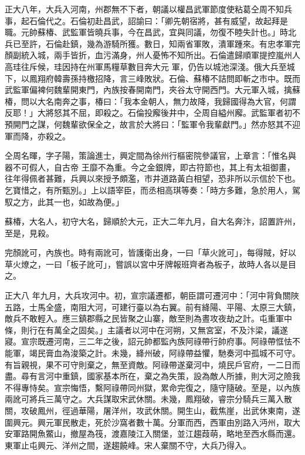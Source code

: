 \begin{pinyinscope}
 正大八年，大兵入河南，州郡無不下者，朝議以權昌武軍節度使粘葛仝周不知兵事，起石倫代之。石倫初赴昌武，詔諭曰：「卿先朝宿將，甚有威望，故起拜是職。元帥蘇椿、武監軍皆曉兵事，今在昌武，宜與同議，勿復不睦失計也。」時北兵已至許，石倫赴鎮，幾為游騎所獲。數日，知兩省軍敗，潰軍踵來。有忠孝軍完顏副統入城，兩手皆折，血污滿身，州人憂怖不知所出。石倫遣歸順軍提控嵐州人高珪往斥候，珪因持在州軍馬糧草數目奔大元
 軍，仍告以城池深淺。俄大兵至城下，以鳳翔府韓壽孫持檄招降，言三峰敗狀。石倫、蘇椿不詰問即斬之市中。既而武監軍偏裨何魏輩開東門，內族按春開南門，夾谷太守開西門。大元軍入城，擒蘇椿，問以大名南奔之事，椿曰：「我本金朝人，無力故降，我歸國得為大官，何謂反耶！」大將怒其不屈，即殺之。石倫投廨後井中，仝周自縊州廨。武監軍者初不預開門之謀，何魏輩欲保全之，故言於大將曰：「監軍令我輩獻門。」然亦怒其不迎軍而降，亦殺之。



 仝周名暉，字子陽，策論進士，興定間為徐州行樞密院參議官，上章言：「惟名與器不可假人，自古帝
 王靡不為重。今之金銀牌，即古符節也，其上有太祖御畫，往年得佩者甚難，兵興以來授予頗濫，市井道路黃白相望，恐非所以示信於下也。乞寶惜之，有所甄別。」上以語宰臣，而丞相高琪等奏：「時方多難，急於用人，駕馭之方，此其一也，如故為便。」



 蘇椿，大名人，初守大名，歸順於大元，正大二年九月，自大名奔汴，詔置許州，至是，見殺。



 完顏訛可，內族也。時有兩訛可，皆護衛出身，一曰「草火訛可」，每得賊，好以草火燎之，一曰「板子訛可」，嘗誤以宮中牙牌報班齊者為板子，故時人各以是目之。



 正大八
 年九月，大兵攻河中。初，宣宗議遷都，朝臣謂可遷河中：「河中背負關陜五路，士馬全盛，南阻大河，可建行臺以為右翼。前有絳陽、平陽、太原三大鎮，敵兵不敢輕入。應三鎮郡縣之民皆聚之山寨，敵至則為晝攻夜劫之計。屯重軍中條，則行在有萬全之固矣。」主議者以河中在河朔，又無宮室，不及汴梁，議遂寢。宣宗既遷河南，三二年之後，詔元帥都監內族阿祿帶行帥府事。阿祿帶恇怯不能軍，竭民膏血為浚築之計。未幾，絳州破，阿祿帶益懼，馳奏河中孤城不可守。有旨親視，果不可守則棄之，無至資敵。阿祿帶遂棄河中，燒民戶官府，一二日而
 盡。尋有言河中重鎮，國家基本所在，棄之為失策，設為敵人所據，則大河之險我不得專恃矣。宣宗悔悟，繫阿祿帶同州獄，累命完復之，隨守隨破。至是，以內族兩訛可將兵三萬守之。大兵謀取宋武休關。未幾，鳳翔破，睿宗分騎兵三萬入散關，攻破鳳州，徑過華陽，屠洋州，攻武休關。開生山，截焦崖，出武休東南，遂圍興元。興元軍民散走，死於沙窩者數十萬。分軍而西，西軍由別路入沔州，取大安軍路開魚鱉山，撤屋為筏，渡嘉陵江入關堡，並江趨葭萌，略地至西水縣而還。東軍止屯興元、洋州之間，遂趨饒峰。宋人棄關不守，大兵乃得入。




\end{pinyinscope}
